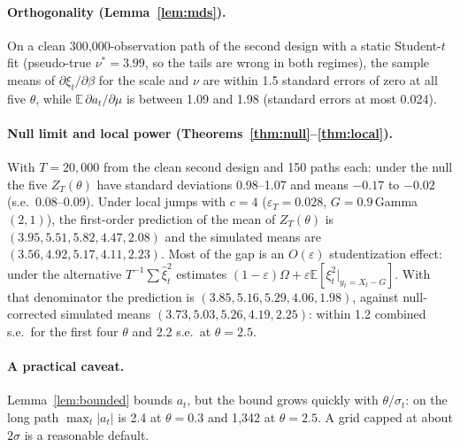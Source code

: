 \documentclass[11pt,a4paper]{article}
\theoremstyle{definition}
\theoremstyle{remark}
\newcommand{\E}{\mathbb{E}}
\begin{document}
\paragraph{Orthogonality (Lemma~\ref{lem:mds}).} On a clean 300{,}000-observation path of the second design with a static Student-$t$ fit (pseudo-true $\nu^*=3.99$, so the tails are wrong in both regimes), the sample means of $\partial\xi_t/\partial\beta$ for the scale and $\nu$ are within 1.5 standard errors of zero at all five $\theta$, while $\E\,\partial a_t/\partial\mu$ is between 1.09 and 1.98 (standard errors at most 0.024).

\paragraph{Null limit and local power (Theorems~\ref{thm:null}--\ref{thm:local}).} With $T=20{,}000$ from the clean second design and 150 paths each: under the null the five $Z_T(\theta)$ have standard deviations 0.98--1.07 and means $-0.17$ to $-0.02$ (s.e.\ 0.08--0.09). Under local jumps with $c=4$ ($\varepsilon_T=0.028$, $G=0.9\,$Gamma$(2,1)$), the first-order prediction of the mean of $Z_T(\theta)$ is $(3.95,5.51,5.82,4.47,2.08)$ and the simulated means are $(3.56,4.92,5.17,4.11,2.23)$. Most of the gap is an $O(\varepsilon)$ studentization effect: under the alternative $T^{-1}\sum\hat\xi_t^2$ estimates $(1-\varepsilon)\Omega+\varepsilon\E[\xi_t^2|_{y_t=X_t-G}]$. With that denominator the prediction is $(3.85,5.16,5.29,4.06,1.98)$, against null-corrected simulated means $(3.73,5.03,5.26,4.19,2.25)$: within 1.2 combined s.e.\ for the first four $\theta$ and 2.2 s.e.\ at $\theta=2.5$.

\paragraph{A practical caveat.} Lemma~\ref{lem:bounded} bounds $a_t$, but the bound grows quickly with $\theta/\sigma_t$: on the long path $\max_t|a_t|$ is 2.4 at $\theta=0.3$ and 1{,}342 at $\theta=2.5$. A grid capped at about $2\hat\sigma$ is a reasonable default.
\end{document}
